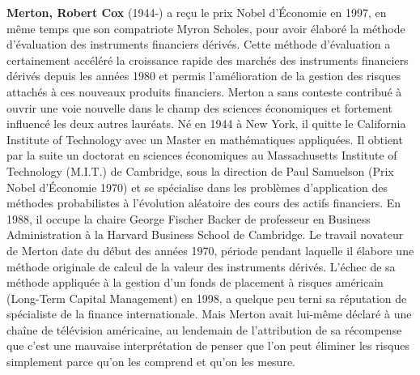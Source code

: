 \textbf{Merton, Robert Cox} (1944-) a reçu le prix Nobel d'Économie en 1997, en même temps que son compatriote Myron Scholes, pour avoir élaboré la méthode d'évaluation des instruments financiers dérivés. Cette méthode d'évaluation a certainement accéléré la croissance rapide des marchés des instruments financiers dérivés depuis les années 1980 et permis l'amélioration de la gestion des risques attachés à ces nouveaux produits financiers. Merton a sans conteste contribué à ouvrir une voie nouvelle dans le champ des sciences économiques et fortement influencé les deux autres lauréats. Né en 1944 à New York, il quitte le California Institute of Technology avec un Master en mathématiques appliquées. Il obtient par la suite un doctorat en sciences économiques au Massachusetts Institute of Technology (M.I.T.) de Cambridge, sous la direction de Paul Samuelson (Prix Nobel d'Économie 1970) et se spécialise dans les problèmes d'application des méthodes probabilistes à l'évolution aléatoire des cours des actifs financiers. En 1988, il occupe la chaire George Fischer Backer de professeur en Business Administration à la Harvard Business School de Cambridge. Le travail novateur de Merton date du début des années 1970, période pendant laquelle il élabore une méthode originale de calcul de la valeur des instruments dérivés. L'échec de sa méthode appliquée à la gestion d'un fonds de placement à risques américain (Long-Term Capital Management) en 1998, a quelque peu terni sa réputation de spécialiste de la finance internationale. Mais Merton avait lui-même déclaré à une chaîne de télévision américaine, au lendemain de l'attribution de sa récompense que c'est une mauvaise interprétation de penser que l'on peut éliminer les risques simplement parce qu'on les comprend et qu'on les mesure.

